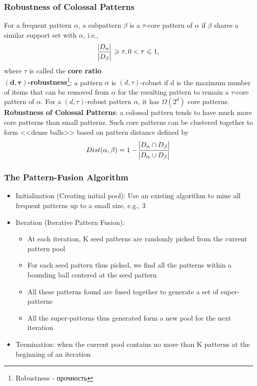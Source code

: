 \subsubsection{Robustness of Colossal Patterns}
For a frequent pattern $\alpha$, a subpattern $\beta$ is a $\tau$-core pattern of $\alpha$ if $\beta$ shares a similar support set with $\alpha$, i.e., 
\begin{equation*}
\frac{\abs{D_\alpha}}{\abs{D_\beta}} \geqslant \tau, 0 < \tau \leqslant 1, 
\end{equation*}
where $\tau$ is called the \textbf{core ratio}.\\

\textbf{$\mathbf{(d, \tau)}$-robustness}\footnote{Robustness - прочность}: a pattern $\alpha$ is $(d, \tau)$-robust if d is the maximum number of items that can be removed from $\alpha$ for the resulting pattern to remain a $\tau$-core pattern of $\alpha$. For a $(d, \tau)$-robust pattern $\alpha$, it has $\Omega (2^d)$ core patterns.\\

\textbf{Robustness of Colossal Patterns}: a colossal pattern tends to have
much more core patterns than small patterns. Such core patterns can be clustered together to form <<dense balls>> based on pattern distance defined by 
\begin{equation*}
Dist(\alpha, \beta)=1-\frac{\abs{D_\alpha \cap D_\beta}}{\abs{D_\alpha \cup D_\beta}}
\end{equation*}

\subsubsection{The Pattern-Fusion Algorithm}
\begin{itemize}
\item Initialization (Creating initial pool): Use an existing algorithm to mine all frequent patterns up to a small size, e.g., 3
\item Iteration (Iterative Pattern Fusion):
\begin{itemize}
\item At each iteration, K seed patterns are randomly picked from the current pattern
pool
\item For each seed pattern thus picked, we find all the patterns within a bounding ball centered at the seed pattern
\item All these patterns found are fused together to generate a set of super-patterns
\item All the super-patterns thus generated form a new pool for the next iteration
\end{itemize}
\item Termination: when the current pool contains no more than K patterns at the beginning of an iteration
\end{itemize}

